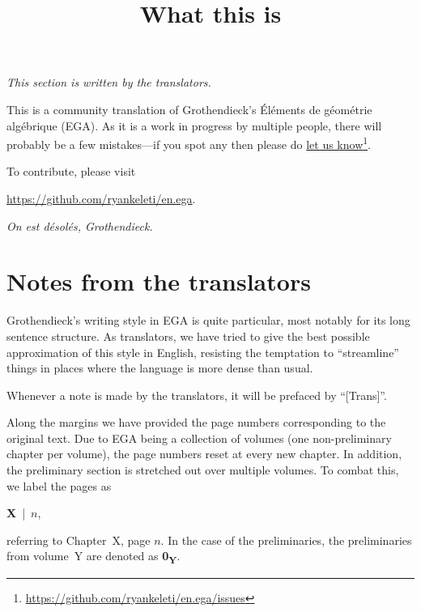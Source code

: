 


\title{What this is}
\maketitle

\label{section-phantom}

\noindent
\emph{This section is written by the translators.}

\noindent
This is a community translation of Grothendieck's \'El\'ements de g\'eom\'etrie alg\'ebrique (EGA).
As it is a work in progress by multiple people, there will probably be a few mistakes---if you spot any then please do \href{https://github.com/ryankeleti/en.ega/issues}{let us know}\footnote{\url{https://github.com/ryankeleti/en.ega/issues}}.

\noindent
To contribute, please visit
\begin{center}
  \url{https://github.com/ryankeleti/en.ega}.
\end{center}

\noindent
\emph{On est d\'esol\'es, Grothendieck.}

\section*{Notes from the translators}
Grothendieck's writing style in EGA is quite particular, most notably for its long sentence structure.
As translators, we have tried to give the best possible approximation of this style in English, resisting the temptation to ``streamline'' things in places where the language is more dense than usual.

\sectionbreak

Whenever a note is made by the translators, it will be prefaced by ``[Trans]''.

\sectionbreak

Along the margins we have provided the page numbers corresponding to the original text.
Due to EGA being a collection of volumes (one non-preliminary chapter per volume), the page numbers reset at every new chapter.
In addition, the preliminary section is stretched out over multiple volumes.
To combat this, we label the pages as
\begin{center}
  \textbf{X}~|~$n$,
\end{center}
referring to Chapter~X, page $n$.
In the case of the preliminaries, the preliminaries from volume~Y are denoted as \textbf{0\textsubscript{Y}}.

